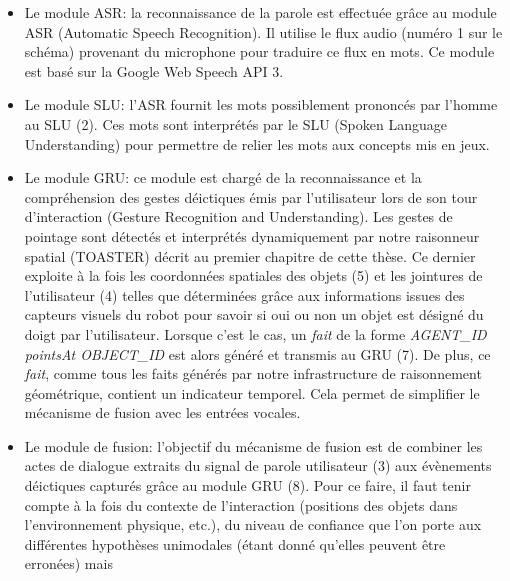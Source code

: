 \documentclass[a4paper,11pt,twoside]{StyleThese}
\begin{document}
\begin{itemize}
\item Le module ASR: la reconnaissance de la parole est effectuée grâce au module ASR (Automatic Speech Recognition). Il utilise le flux audio (numéro 1 sur le schéma) provenant du microphone pour traduire ce flux en mots. Ce module est basé sur la Google Web Speech API 3.
\item Le module SLU: l'ASR fournit les mots possiblement prononcés par l'homme au SLU (2). Ces mots sont interprétés par le SLU (Spoken Language Understanding) pour permettre de relier les mots aux concepts mis en jeux.
\item Le module GRU: ce module est chargé de la reconnaissance et la compréhension des gestes déictiques émis par l’utilisateur lors de son tour d’interaction (Gesture Recognition and Understanding). Les gestes de pointage sont détectés et interprétés dynamiquement par notre raisonneur spatial (TOASTER) décrit au premier chapitre de cette thèse. Ce dernier exploite à la fois les coordonnées spatiales des objets (5) et les jointures de l’utilisateur (4) telles que déterminées grâce aux informations issues des capteurs visuels du robot pour savoir si oui ou non un objet est désigné du
doigt par l’utilisateur. Lorsque c’est le cas, un \textit{fait} de la forme \textit{AGENT\_ID pointsAt
OBJECT\_ID} est alors généré et transmis au GRU (7). De plus, ce \textit{fait}, comme tous les faits générés par notre infrastructure de raisonnement géométrique, contient un indicateur temporel. Cela permet de simplifier le mécanisme de
fusion avec les entrées vocales.
\item Le module de fusion: l’objectif du mécanisme de fusion est de combiner les actes de dialogue extraits du
signal de parole utilisateur (3) aux évènements déictiques capturés grâce au module GRU (8).
Pour ce faire, il faut tenir compte à la fois du contexte de l’interaction (positions des
objets dans l’environnement physique, etc.), du niveau de confiance que l’on porte aux
différentes hypothèses unimodales (étant donné qu’elles peuvent être erronées) mais

\end{itemize}
\end{document}
